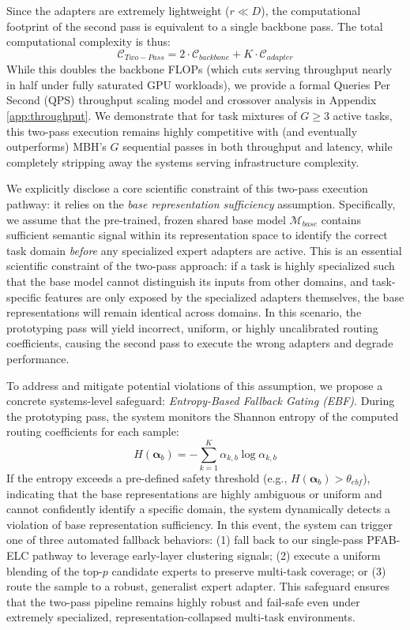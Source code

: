 Since the adapters are extremely lightweight ($r \ll D$), the computational footprint of the second pass is equivalent to a single backbone pass. The total computational complexity is thus:
\begin{equation}
  \mathcal{C}_{Two-Pass} = 2 \cdot \mathcal{C}_{backbone} + K \cdot \mathcal{C}_{adapter}
\end{equation}
While this doubles the backbone FLOPs (which cuts serving throughput nearly in half under fully saturated GPU workloads), we provide a formal Queries Per Second (QPS) throughput scaling model and crossover analysis in Appendix \ref{app:throughput}. We demonstrate that for task mixtures of $G \ge 3$ active tasks, this two-pass execution remains highly competitive with (and eventually outperforms) MBH's $G$ sequential passes in both throughput and latency, while completely stripping away the systems serving infrastructure complexity.

We explicitly disclose a core scientific constraint of this two-pass execution pathway: it relies on the \emph{base representation sufficiency} assumption. Specifically, we assume that the pre-trained, frozen shared base model $\mathcal{M}_{base}$ contains sufficient semantic signal within its representation space to identify the correct task domain \emph{before} any specialized expert adapters are active. This is an essential scientific constraint of the two-pass approach: if a task is highly specialized such that the base model cannot distinguish its inputs from other domains, and task-specific features are only exposed by the specialized adapters themselves, the base representations will remain identical across domains. In this scenario, the prototyping pass will yield incorrect, uniform, or highly uncalibrated routing coefficients, causing the second pass to execute the wrong adapters and degrade performance. 

To address and mitigate potential violations of this assumption, we propose a concrete systems-level safeguard: \emph{Entropy-Based Fallback Gating (EBF)}. During the prototyping pass, the system monitors the Shannon entropy of the computed routing coefficients for each sample:
\begin{equation}
  H(\boldsymbol{\alpha}_b) = -\sum_{k=1}^K \alpha_{k, b} \log \alpha_{k, b}
\end{equation}
If the entropy exceeds a pre-defined safety threshold (e.g., $H(\boldsymbol{\alpha}_b) > \theta_{ebf}$), indicating that the base representations are highly ambiguous or uniform and cannot confidently identify a specific domain, the system dynamically detects a violation of base representation sufficiency. In this event, the system can trigger one of three automated fallback behaviors: (1) fall back to our single-pass \textsc{PFAB-ELC} pathway to leverage early-layer clustering signals; (2) execute a uniform blending of the top-$p$ candidate experts to preserve multi-task coverage; or (3) route the sample to a robust, generalist expert adapter. This safeguard ensures that the two-pass pipeline remains highly robust and fail-safe even under extremely specialized, representation-collapsed multi-task environments.

